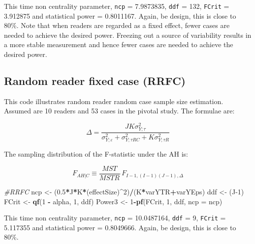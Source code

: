 \documentclass[]{book}
\newenvironment{Shaded}{\begin{snugshade}}{\end{snugshade}}
\newcommand{\CommentTok}[1]{\textcolor[rgb]{0.56,0.35,0.01}{\textit{#1}}}
\newcommand{\DataTypeTok}[1]{\textcolor[rgb]{0.13,0.29,0.53}{#1}}
\newcommand{\DecValTok}[1]{\textcolor[rgb]{0.00,0.00,0.81}{#1}}
\newcommand{\FloatTok}[1]{\textcolor[rgb]{0.00,0.00,0.81}{#1}}
\newcommand{\KeywordTok}[1]{\textcolor[rgb]{0.13,0.29,0.53}{\textbf{#1}}}
\newcommand{\NormalTok}[1]{#1}
\newcommand{\OperatorTok}[1]{\textcolor[rgb]{0.81,0.36,0.00}{\textbf{#1}}}
\newcommand{\StringTok}[1]{\textcolor[rgb]{0.31,0.60,0.02}{#1}}
\begin{document}
This time non centrality parameter, \texttt{ncp} = 7.9873835, \texttt{ddf} = 132, \texttt{FCrit} = 3.912875 and statistical power = 0.8011167. Again, be design, this is close to 80\%. Note that when readers are regarded as a fixed effect, fewer cases are needed to achieve the desired power. Freezing out a source of variability results in a more stable measurement and hence fewer cases are needed to achieve the desired power.

\hypertarget{random-reader-fixed-case-rrfc}{%
\subsection{Random reader fixed case (RRFC)}\label{random-reader-fixed-case-rrfc}}

This code illustrates random reader random case sample size estimation. Assumed are 10 readers and 53 cases in the pivotal study. The formulae are:

\[\Delta =\frac{JK\sigma _{Y;\tau }^{2}}{\sigma _{Y;\varepsilon }^{2}+\sigma _{Y;\tau RC}^{2}+K\sigma _{Y;\tau R}^{2}}\]

The sampling distribution of the F-statistic under the AH is:

\[{{F}_{\left. AH \right|C}}\equiv \frac{MST}{MSTR}\tilde{\ }{{F}_{I-1,\left( I-1 \right)\left( J-1 \right),\Delta }}\]

\begin{Shaded}
\begin{Highlighting}[]
\CommentTok{#RRFC}
\NormalTok{ncp <-}\StringTok{ }\NormalTok{(}\FloatTok{0.5}\OperatorTok{*}\NormalTok{J}\OperatorTok{*}\NormalTok{K}\OperatorTok{*}\NormalTok{(effectSize)}\OperatorTok{^}\DecValTok{2}\NormalTok{)}\OperatorTok{/}\NormalTok{(K}\OperatorTok{*}\NormalTok{varYTR}\OperatorTok{+}\NormalTok{varYEps)}
\NormalTok{ddf <-}\StringTok{ }\NormalTok{(J}\DecValTok{-1}\NormalTok{)}
\NormalTok{FCrit <-}\StringTok{ }\KeywordTok{qf}\NormalTok{(}\DecValTok{1} \OperatorTok{-}\StringTok{ }\NormalTok{alpha, }\DecValTok{1}\NormalTok{, ddf)}
\NormalTok{Power3 <-}\StringTok{ }\DecValTok{1}\OperatorTok{-}\KeywordTok{pf}\NormalTok{(FCrit, }\DecValTok{1}\NormalTok{, ddf, }\DataTypeTok{ncp =}\NormalTok{ ncp)}
\end{Highlighting}
\end{Shaded}

This time non centrality parameter, \texttt{ncp} = 10.0487164, \texttt{ddf} = 9, \texttt{FCrit} = 5.117355 and statistical power = 0.8049666. Again, be design, this is close to 80\%.
\end{document}
